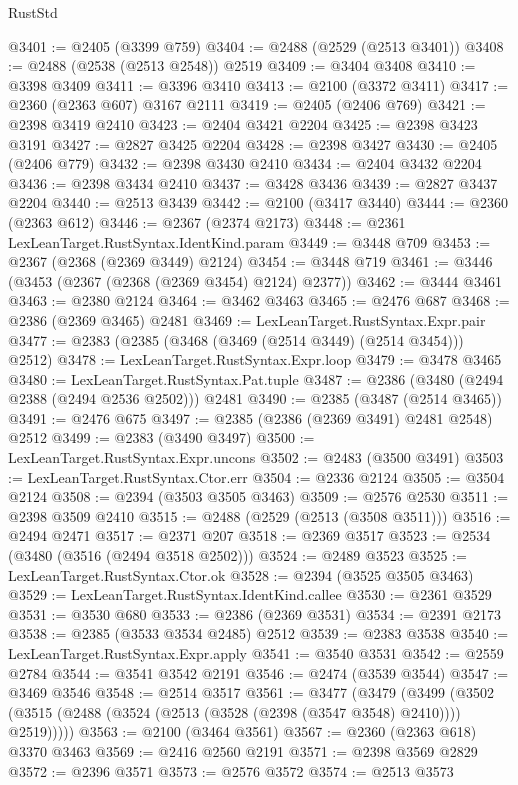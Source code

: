 \begin{lexlean}{RustStd}
\begin{coremodule}
{\begin{coremodule}
{{{{{{{{{{{{{{{{{{{{{{{{{{{{{{{{{{{{{{{{{{{{{{{{{{@3401 := @2405 (@3399 @759)
@3404 := @2488 (@2529 (@2513 @3401))
@3408 := @2488 (@2538 (@2513 @2548)) @2519
@3409 := @3404 @3408
@3410 := @3398 @3409
@3411 := @3396 @3410
@3413 := @2100 (@3372 @3411)
@3417 := @2360 (@2363 @607) @3167 @2111
@3419 := @2405 (@2406 @769)
@3421 := @2398 @3419 @2410
@3423 := @2404 @3421 @2204
@3425 := @2398 @3423 @3191
@3427 := @2827 @3425 @2204
@3428 := @2398 @3427
@3430 := @2405 (@2406 @779)
@3432 := @2398 @3430 @2410
@3434 := @2404 @3432 @2204
@3436 := @2398 @3434 @2410
@3437 := @3428 @3436
@3439 := @2827 @3437 @2204
@3440 := @2513 @3439
@3442 := @2100 (@3417 @3440)
@3444 := @2360 (@2363 @612)
@3446 := @2367 (@2374 @2173)
@3448 := @2361 LexLeanTarget.RustSyntax.IdentKind.param
@3449 := @3448 @709
@3453 := @2367 (@2368 (@2369 @3449) @2124)
@3454 := @3448 @719
@3461 := @3446 (@3453 (@2367 (@2368 (@2369 @3454) @2124) @2377))
@3462 := @3444 @3461
@3463 := @2380 @2124
@3464 := @3462 @3463
@3465 := @2476 @687
@3468 := @2386 (@2369 @3465) @2481
@3469 := LexLeanTarget.RustSyntax.Expr.pair
@3477 := @2383 (@2385 (@3468 (@3469 (@2514 @3449) (@2514 @3454))) @2512)
@3478 := LexLeanTarget.RustSyntax.Expr.loop
@3479 := @3478 @3465
@3480 := LexLeanTarget.RustSyntax.Pat.tuple
@3487 := @2386 (@3480 (@2494 @2388 (@2494 @2536 @2502))) @2481
@3490 := @2385 (@3487 (@2514 @3465))
@3491 := @2476 @675
@3497 := @2385 (@2386 (@2369 @3491) @2481 @2548) @2512
@3499 := @2383 (@3490 @3497)
@3500 := LexLeanTarget.RustSyntax.Expr.uncons
@3502 := @2483 (@3500 @3491)
@3503 := LexLeanTarget.RustSyntax.Ctor.err
@3504 := @2336 @2124
@3505 := @3504 @2124
@3508 := @2394 (@3503 @3505 @3463)
@3509 := @2576 @2530
@3511 := @2398 @3509 @2410
@3515 := @2488 (@2529 (@2513 (@3508 @3511)))
@3516 := @2494 @2471
@3517 := @2371 @207
@3518 := @2369 @3517
@3523 := @2534 (@3480 (@3516 (@2494 @3518 @2502)))
@3524 := @2489 @3523
@3525 := LexLeanTarget.RustSyntax.Ctor.ok
@3528 := @2394 (@3525 @3505 @3463)
@3529 := LexLeanTarget.RustSyntax.IdentKind.callee
@3530 := @2361 @3529
@3531 := @3530 @680
@3533 := @2386 (@2369 @3531)
@3534 := @2391 @2173
@3538 := @2385 (@3533 @3534 @2485) @2512
@3539 := @2383 @3538
@3540 := LexLeanTarget.RustSyntax.Expr.apply
@3541 := @3540 @3531
@3542 := @2559 @2784
@3544 := @3541 @3542 @2191
@3546 := @2474 (@3539 @3544)
@3547 := @3469 @3546
@3548 := @2514 @3517
@3561 := @3477
    (@3479
      (@3499 (@3502 (@3515 (@2488 (@3524 (@2513 (@3528 (@2398 (@3547 @3548) @2410)))) @2519)))))
@3563 := @2100 (@3464 @3561)
@3567 := @2360 (@2363 @618) @3370 @3463
@3569 := @2416 @2560 @2191
@3571 := @2398 @3569 @2829
@3572 := @2396 @3571
@3573 := @2576 @3572
@3574 := @2513 @3573
}}}}}}}}}}}}}}}}}}}}}}}}}}}}}}}}}}}}}}}}}}}}}}}}}}
\end{coremodule}}
\end{coremodule}
\end{lexlean}
